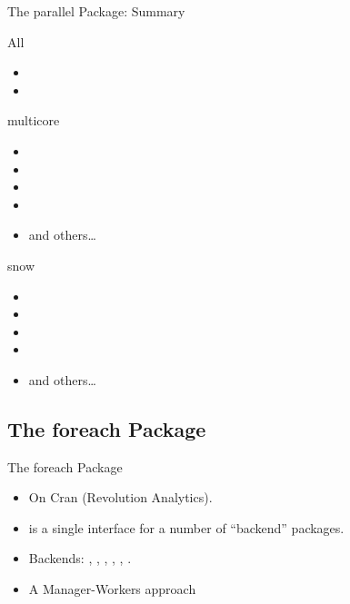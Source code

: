 \begin{frame}{The parallel Package: Summary}
  \begin{block}{All}
    \begin{itemize}
      \item {}
      \item {}
    \end{itemize}
  \end{block}
  \begin{minipage}[t]{.475\textwidth}
    \begin{block}{multicore}
      \begin{itemize}
        \item {}
        \item {}
        \item {}
        \item {}
        \item and others\dots
      \end{itemize}
    \end{block}
  \end{minipage}
  \hfill
  \begin{minipage}[t]{.475\textwidth}
    \begin{block}{snow}
      \begin{itemize}
        \item {}
        \item {}
        \item {}
        \item {}
        \item and others\dots
      \end{itemize}
    \end{block}
  \end{minipage}
\end{frame}


\subsection{The foreach Package}
\makesubcontentsslidessec

\begin{frame}
  \begin{block}{The foreach Package}
    \begin{itemize}
    \item On Cran (Revolution Analytics).
    \item {} is a single interface for a number of
      ``backend'' packages.
    \item Backends:  , , , ,
      , .
    \item A Manager-Workers approach
    \end{itemize}
  \end{block}
\end{frame}


